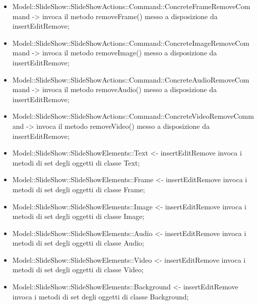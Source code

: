 {\begin{itemize}
		\item Model::\-SlideShow::\-SlideShowActions::\-Command::\-ConcreteFrameRemoveCommand -> invoca il metodo removeFrame() messo a disposizione da insertEditRemove;
		\item Model::\-SlideShow::\-SlideShowActions::\-Command::\-ConcreteImageRemoveCommand -> invoca il metodo removeImage() messo a disposizione da insertEditRemove;
		\item Model::\-SlideShow::\-SlideShowActions::\-Command::\-ConcreteAudioRemoveCommand -> invoca il metodo removeAudio() messo a disposizione da insertEditRemove;
		\item Model::\-SlideShow::\-SlideShowActions::\-Command::\-ConcreteVideoRemoveCommand -> invoca il metodo removeVideo() messo a disposizione da insertEditRemove;
			
			\item Model::\-SlideShow::\-SlideShowElements::\-Text <- insertEditRemove invoca i metodi di set degli oggetti di classe Text;
			\item Model::\-SlideShow::\-SlideShowElements::\-Frame <- insertEditRemove invoca i metodi di set degli oggetti di classe Frame;
			\item Model::\-SlideShow::\-SlideShowElements::\-Image <- insertEditRemove invoca i metodi di set degli oggetti di classe Image;
			\item Model::\-SlideShow::\-SlideShowElements::\-Audio <- insertEditRemove invoca i metodi di set degli oggetti di classe Audio;
			\item Model::\-SlideShow::\-SlideShowElements::\-Video <- insertEditRemove invoca i metodi di set degli oggetti di classe Video;
			\item Model::\-SlideShow::\-SlideShowElements::\-Background <- insertEditRemove invoca i metodi di set degli oggetti di classe Background;



\end{itemize}}
